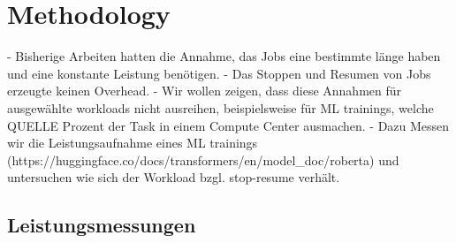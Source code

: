 \chapter{Methodology}

- Bisherige Arbeiten hatten die Annahme, das Jobs eine bestimmte länge haben und eine konstante Leistung benötigen.
- Das Stoppen und Resumen von Jobs erzeugte keinen Overhead. 
- Wir wollen zeigen, dass diese Annahmen für ausgewählte workloads nicht ausreihen, beispielsweise für ML trainings, welche QUELLE Prozent der Task in einem Compute Center ausmachen.
- Dazu Messen wir die Leistungsaufnahme eines ML trainings (https://huggingface.co/docs/transformers/en/model_doc/roberta) und untersuchen wie sich der Workload bzgl. stop-resume verhält.

\section{Leistungsmessungen}

